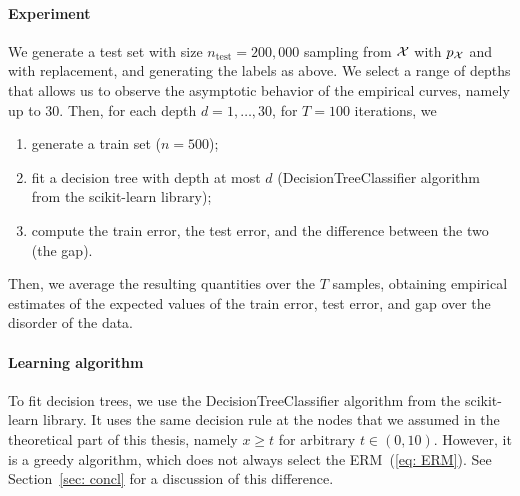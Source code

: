 \documentclass[reqno]{amsart}
\begin{document}
\paragraph{Experiment} We generate a test set with size $n_\text{test} = 200,000$ sampling from $\mathcal{X}$ with $p_{\mathcal{X}}$ and with replacement, and generating the labels as above. We select a range of depths that allows us to observe the asymptotic behavior of the empirical curves, namely up to $30$. Then, for each depth $d = 1,\ldots, 30$, for $T=100$ iterations, we 
\begin{enumerate}
    \item[(1)] generate a train set ($n= 500$);
    \item[(2)] fit a decision tree with depth at most $d$ (DecisionTreeClassifier algorithm from the scikit-learn library);
    \item[(3)] compute the train error, the test error, and the difference between the two (the gap).
\end{enumerate}
Then, we average the resulting quantities over the $T$ samples, obtaining empirical estimates of the expected values of the train error, test error, and gap over the disorder of the data. 

\paragraph{Learning algorithm} To fit decision trees, we use the DecisionTreeClassifier algorithm from the scikit-learn library. It uses the same decision rule at the nodes that we assumed in the theoretical part of this thesis, namely $x\ge t$ for arbitrary $t\in (0,10)$. However, it is a greedy algorithm, which does not always select the ERM~(\ref{eq: ERM}). See Section~\ref{sec: concl} for a discussion of this difference. 
\end{document}
